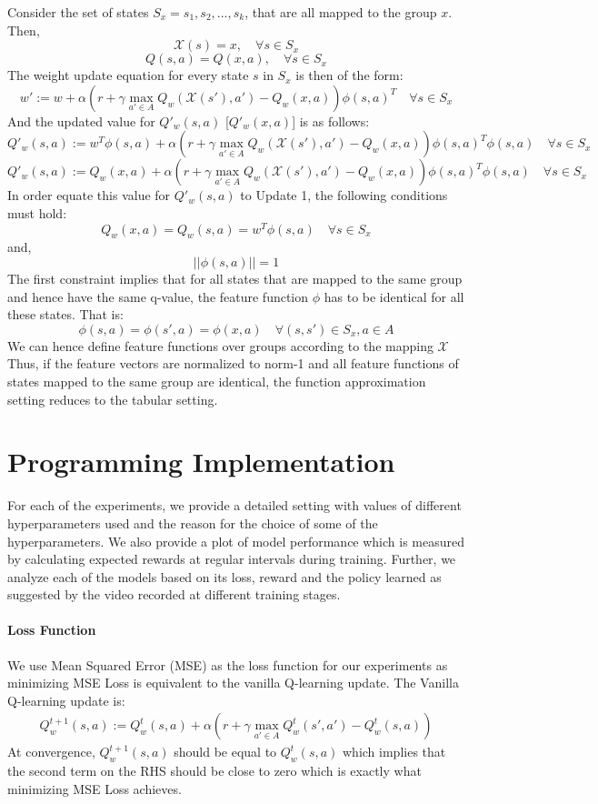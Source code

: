 \documentclass[12pt]{article}
\begin{document}
\noindent

\begin{solution}
Consider the set of states $S_x = {s_1, s_2, ..., s_k}$, that are all mapped to the group $x$. Then, 
$$\mathcal{X}(s) = x, \quad \forall s \in S_x$$
$$Q(s,a) = Q(x,a), \quad \forall s \in S_x$$
The weight update equation for every state $s$ in $S_x$ is then of the form:
	$$w' := w + 
		\alpha \left( 
			r + \gamma \max _{a' \in A} Q _w(\mathcal{X}(s'), a') 
				- Q_w(x, a) 
		\right)\phi(s, a)^T \quad \forall s \in S_x $$
And the updated value for $Q'_{w}(s, a)$ [$Q'_{w}(x, a)$] is as follows:
	$$Q'_{w}(s, a) := w^T\phi(s, a) + 
		\alpha \left( 
			r + \gamma \max _{a' \in A} Q _w(\mathcal{X}(s'), a') 
				- Q _w(x, a) 
		\right)\phi(s, a)^T\phi(s, a) \quad \forall s \in S_x $$
	$$Q'_{w}(s, a) := Q_w(x,a) + 
		\alpha \left( 
			r + \gamma \max _{a' \in A} Q _w(\mathcal{X}(s'), a') 
				- Q _w(x, a) 
		\right)\phi(s, a)^T\phi(s, a) \quad \forall s \in S_x$$
In order equate this value for $Q'_{w}(s, a)$ to Update 1, the following conditions must hold:
$$Q_w(x,a) = Q_w(s,a) = w^T\phi(s, a) \quad \forall s \in S_x$$
and, 
$$||\phi(s, a)|| = 1$$ 
The first constraint implies that for all states that are mapped to the same group and hence have the same q-value, the feature function $\phi$ has to be identical for all these states. That is:
$$\phi(s, a) = \phi(s', a) = \phi(x,a) \quad \forall (s,s') \in S_x , a\in A$$
We can hence define feature functions over groups according to the mapping $\mathcal{X}$
Thus, if the feature vectors are normalized to norm-1 and all feature functions of states mapped to the same group are identical, the function approximation setting reduces to the tabular setting.
\end{solution}

\section{Programming Implementation}
For each of the experiments, we provide a detailed setting with values of different hyperparameters used and the reason for the choice of some of the hyperparameters. We also provide a plot of model performance which is measured by calculating expected rewards at regular intervals during training. Further, we analyze each of the models based on its loss, reward and the policy learned as suggested by the video recorded at different training stages.

\paragraph{Loss Function} We use Mean Squared Error (MSE) as the loss function for our experiments as minimizing MSE Loss is equivalent to the vanilla Q-learning update. The Vanilla Q-learning update is:
\begin{align*}
	Q_w^{t+1}(s, a) := Q_w^{t}(s, a) + 
		\alpha \left( 
			r + \gamma \max _{a' \in A} Q_w^t(s', a') 
				- Q_w^t(s, a) 
		\right)
\end{align*}
At convergence, $Q_w^{t+1}(s, a)$ should be equal to $Q_w^{t}(s, a)$ which implies that the second term on the RHS should be close to zero which is exactly what minimizing MSE Loss achieves.
\end{document}
